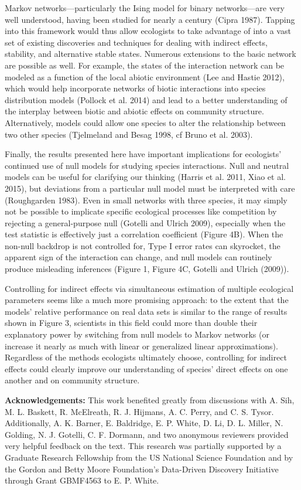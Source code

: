 \documentclass[12pt,]{article}
\begin{document}
\begin{spacing}{1.9}
\begin{flushleft}
Markov networks---particularly the Ising model for binary networks---are
very well understood, having been studied for nearly a century (Cipra
1987). Tapping into this framework would thus allow ecologists to take
advantage of into a vast set of existing discoveries and techniques for
dealing with indirect effects, stability, and alternative stable states.
Numerous extensions to the basic network are possible as well. For
example, the states of the interaction network can be modeled as a
function of the local abiotic environment (Lee and Hastie 2012), which
would help incorporate networks of biotic interactions into species
distribution models (Pollock et al. 2014) and lead to a better
understanding of the interplay between biotic and abiotic effects on
community structure. Alternatively, models could allow one species to
alter the relationship between two other species (Tjelmeland and Besag
1998, cf Bruno et al. 2003).

Finally, the results presented here have important implications for
ecologists' continued use of null models for studying species
interactions. Null and neutral models can be useful for clarifying our
thinking (Harris et al. 2011, Xiao et al. 2015), but deviations from a
particular null model must be interpreted with care (Roughgarden 1983).
Even in small networks with three species, it may simply not be possible
to implicate specific ecological processes like competition by rejecting
a general-purpose null (Gotelli and Ulrich 2009), especially when the
test statistic is effectively just a correlation coefficient (Figure
4B). When the non-null backdrop is not controlled for, Type I error
rates can skyrocket, the apparent sign of the interaction can change,
and null models can routinely produce misleading inferences (Figure 1,
Figure 4C, Gotelli and Ulrich (2009)).

Controlling for indirect effects via simultaneous estimation of multiple
ecological parameters seems like a much more promising approach: to the
extent that the models' relative performance on real data sets is
similar to the range of results shown in Figure 3, scientists in this
field could more than double their explanatory power by switching from
null models to Markov networks (or increase it nearly as much with
linear or generalized linear approximations). Regardless of the methods
ecologists ultimately choose, controlling for indirect effects could
clearly improve our understanding of species' direct effects on one
another and on community structure.

\noindent \textbf{Acknowledgements:} This work benefited greatly from
discussions with A. Sih, M. L. Baskett, R. McElreath, R. J. Hijmans, A.
C. Perry, and C. S. Tysor. Additionally, A. K. Barner, E. Baldridge, E.
P. White, D. Li, D. L. Miller, N. Golding, N. J. Gotelli, C. F. Dormann,
and two anonymous reviewers provided very helpful feedback on the text.
This research was partially supported by a Graduate Research Fellowship
from the US National Science Foundation and by the Gordon and Betty
Moore Foundation's Data-Driven Discovery Initiative through Grant
GBMF4563 to E. P. White.


\end{flushleft}
\end{spacing}
\end{document}
